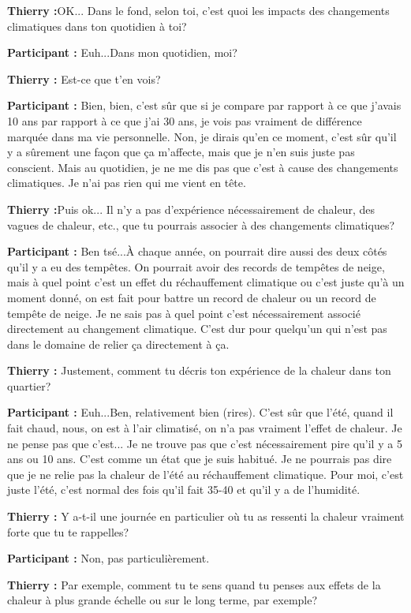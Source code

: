 \textbf{Thierry :}OK... Dans le fond, selon toi, c'est quoi les impacts des changements climatiques dans ton quotidien à toi?

\textbf{Participant :} Euh...Dans mon quotidien, moi?
 
\textbf{Thierry :} Est-ce que t'en vois?
 
\textbf{Participant :} Bien, bien, c'est sûr que si je compare par rapport à ce que j'avais 10 ans par rapport à ce que j'ai 30 ans, je vois pas vraiment de différence marquée dans ma vie personnelle. Non, je dirais qu'en ce moment, c'est sûr qu'il y a sûrement une façon que ça m'affecte, mais que je n'en suis juste pas conscient. Mais au quotidien, je ne me dis pas que c'est à cause des changements climatiques. Je n'ai pas rien qui me vient en tête.

\textbf{Thierry :}Puis ok... Il n'y a pas d'expérience nécessairement de chaleur, des vagues de chaleur, etc., que tu pourrais associer à des changements climatiques?

\textbf{Participant :} Ben tsé...À chaque année, on pourrait dire aussi des deux côtés qu'il y a eu des tempêtes. On pourrait avoir des records de tempêtes de neige, mais à quel point c'est un effet du réchauffement climatique ou c'est juste qu'à un moment donné, on est fait pour battre un record de chaleur ou un record de tempête de neige. Je ne sais pas à quel point c'est nécessairement associé directement au changement climatique. C'est dur pour quelqu'un qui n'est pas dans le domaine de relier ça directement à ça.

\textbf{Thierry :} Justement, comment tu décris ton expérience de la chaleur dans ton quartier?

\textbf{Participant :} Euh...Ben, relativement bien (rires). C'est sûr que l'été, quand il fait chaud, nous, on est à l'air climatisé, on n'a pas vraiment l'effet de chaleur. Je ne pense pas que c'est... Je ne trouve pas que c'est nécessairement pire qu'il y a 5 ans ou 10 ans. C'est comme un état que je suis habitué. Je ne pourrais pas dire que je ne relie pas la chaleur de l'été au réchauffement climatique. Pour moi, c'est juste l'été, c'est normal des fois qu'il fait 35-40 et qu'il y a de l'humidité.

\textbf{Thierry :} Y a-t-il une journée en particulier où tu as ressenti la chaleur vraiment forte que tu te rappelles?

\textbf{Participant :} Non, pas particulièrement.

\textbf{Thierry :} Par exemple, comment tu te sens quand tu penses aux effets de la chaleur à plus grande échelle ou sur le long terme, par exemple?

